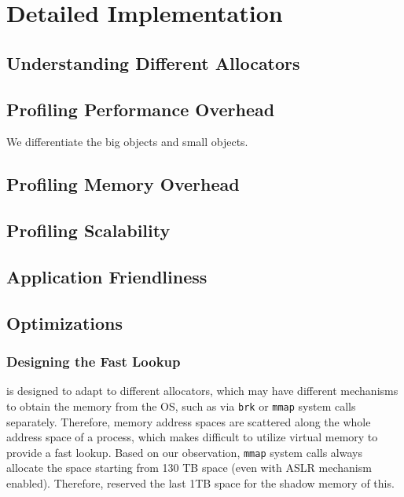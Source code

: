 \section{Detailed Implementation}





\subsection{Understanding Different Allocators}



\subsection{Profiling Performance Overhead}

We differentiate the big objects and small objects. 

\subsection{Profiling Memory Overhead}

\subsection{Profiling Scalability}

\subsection{Application Friendliness}

\subsection{Optimizations}

\subsubsection{Designing the Fast Lookup}

\label{sec:fastlookup}

\MP{} is designed to adapt to different allocators, which may have different mechanisms to obtain the memory from the OS, such as via \texttt{brk} or \texttt{mmap} system calls separately. Therefore, memory address spaces are scattered along the whole address space of a process, which makes difficult to utilize virtual memory to provide a fast lookup. Based on our observation, \texttt{mmap} system calls always allocate the space starting from 130 TB space (even with ASLR mechanism enabled). Therefore, \MP{} reserved the last 1TB space for the shadow memory of this.   
